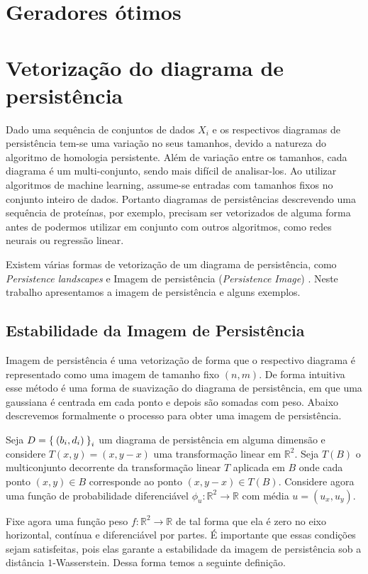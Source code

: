 \section{Geradores ótimos}

\section{Vetorização do diagrama de persistência}
Dado uma sequência de conjuntos de dados $X_i$ e os respectivos diagramas de persistência tem-se uma variação no
seus tamanhos, devido a natureza do algoritmo de homologia persistente. Além de variação entre os tamanhos, cada 
diagrama é um multi-conjunto, sendo mais difícil de analisar-los. Ao utilizar algoritmos de machine learning, 
assume-se entradas com tamanhos fixos no conjunto inteiro de dados. Portanto diagramas de persistências descrevendo
uma sequência de proteínas, por exemplo, precisam ser vetorizados de alguma forma antes de podermos utilizar em
conjunto com outros algoritmos, como redes neurais ou regressão linear. 

Existem várias formas de vetorização de um diagrama de persistência, como \textit{Persistence landscapes}
\cite{bubenik15a} e Imagem de persistência (\textit{Persistence Image}) \cite{Adams2017}. Neste trabalho apresentamos
a imagem de persistência e alguns exemplos.

\subsection{Estabilidade da Imagem de Persistência}
Imagem de persistência é uma vetorização de forma que o respectivo diagrama é representado como 
uma imagem de tamanho fixo $(n,m)$. De forma intuitiva esse método é uma forma de suavização do diagrama 
de persistência, em que uma gaussiana é centrada em cada ponto e depois são somadas com peso. Abaixo descrevemos
formalmente o processo para obter uma imagem de persistência.

Seja $D = \Set{(b_i,d_i)}_{i}$ um diagrama de persistência em alguma dimensão e considere $T(x,y) = (x, y-x)$ 
uma transformação linear em $\mathbb{R}^2$. Seja $T(B)$ o multiconjunto decorrente da transformação linear $T$
aplicada em $B$ onde cada ponto $(x,y) \in B$ corresponde ao ponto $(x,y-x) \in T(B)$. Considere agora uma 
função de probabilidade diferenciável $\phi_u\colon \mathbb{R}^2 \to \mathbb{R}$ com média $u=(u_x, u_y)$. 

Fixe agora uma função peso $f\colon \mathbb{R}^2 \to \mathbb{R}$ de tal forma que ela é zero no eixo horizontal,
contínua e diferenciável por partes. É importante que essas condições sejam satisfeitas, pois elas garante
a estabilidade da imagem de persistência sob a distância $1$-Wasserstein. Dessa forma temos a seguinte definição. 

